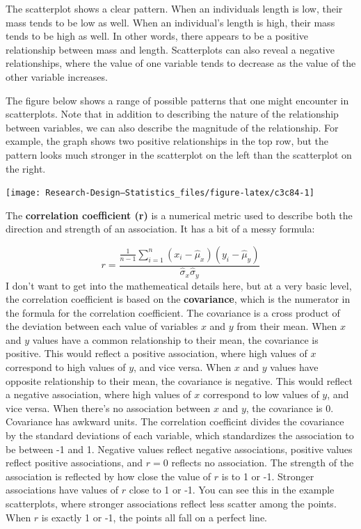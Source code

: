 \documentclass[
]{book}
\begin{document}
The scatterplot shows a clear pattern. When an individuals length is low, their mass tends to be low as well. When an individual's length is high, their mass tends to be high as well. In other words, there appears to be a positive relationship between mass and length. Scatterplots can also reveal a negative relationships, where the value of one variable tends to decrease as the value of the other variable increases.

The figure below shows a range of possible patterns that one might encounter in scatterplots. Note that in addition to describing the nature of the relationship between variables, we can also describe the magnitude of the relationship. For example, the graph shows two positive relationships in the top row, but the pattern looks much stronger in the scatterplot on the left than the scatterplot on the right.

\begin{center}\texttt{[image: Research-Design---Statistics\_files/figure-latex/c3c84-1]} \end{center}

The \textbf{correlation coefficient (r)} is a numerical metric used to describe both the direction and strength of an association. It has a bit of a messy formula:

\[
r = \frac{\frac{1}{n-1} \sum_{i=1}^n (x_i - \hat{\mu}_x)(y_i - \hat{\mu}_y)}{\hat{\sigma}_x \hat{\sigma}_y}
\]
I don't want to get into the mathemeatical details here, but at a very basic level, the correlation coefficient is based on the \textbf{covariance}, which is the numerator in the formula for the correlation coefficient. The covariance is a cross product of the deviation between each value of variables \(x\) and \(y\) from their mean. When \(x\) and \(y\) values have a common relationship to their mean, the covariance is positive. This would reflect a positive association, where high values of \(x\) correspond to high values of \(y\), and vice versa. When \(x\) and \(y\) values have opposite relationship to their mean, the covariance is negative. This would reflect a negative association, where high values of \(x\) correspond to low values of \(y\), and vice versa. When there's no association between \(x\) and \(y\), the covariance is 0. Covariance has awkward units. The correlation coefficint divides the covariance by the standard deviations of each variable, which standardizes the association to be between -1 and 1. Negative values reflect negative associations, positive values reflect positive associations, and \(r=0\) reflects no association. The strength of the association is reflected by how close the value of \(r\) is to 1 or -1. Stronger associations have values of \(r\) close to 1 or -1. You can see this in the example scatterplots, where stronger associations reflect less scatter among the points. When \(r\) is exactly 1 or -1, the points all fall on a perfect line.
\end{document}
